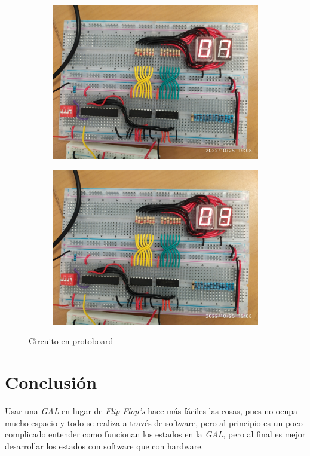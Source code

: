 \documentclass[12pt, oneside, openany]{article}
\begin{document}
\begin{figure}[h!]
    \begin{subfigure}[bl]{0.45\textwidth}
        \centering
        \includegraphics[width=\linewidth]{figs/IMG_20221025_190805.jpg}
    \end{subfigure}
    \begin{subfigure}[br]{0.45\textwidth}
        \centering
        \includegraphics[width=\linewidth]{figs/IMG_20221025_190807.jpg}
    \end{subfigure}

    \caption{\sffamily Circuito en protoboard}
    \label{fig:proto}

\end{figure}

\section{Conclusión}
{\sffamily\large
    \hspace{0.5cm} Usar una \emph{GAL} en lugar de \emph{Flip-Flop's} hace más fáciles
    las cosas, pues no ocupa mucho espacio y todo se realiza a través de software, pero
    al principio es un poco complicado entender como funcionan los estados en la
    \emph{GAL}, pero al final es mejor desarrollar los estados con software que con
    hardware.

}
\end{document}
